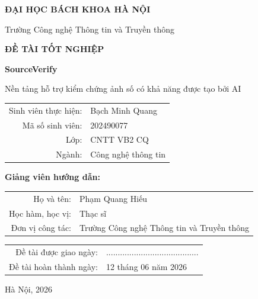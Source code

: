 \begin{titlepage}
\centering
{\Large\bfseries ĐẠI HỌC BÁCH KHOA HÀ NỘI\par}
\vspace{0.35cm}
{\large Trường Công nghệ Thông tin và Truyền thông\par}
\vspace{1.8cm}
{\Large\bfseries ĐỀ TÀI TỐT NGHIỆP\par}
\vspace{0.8cm}
{\Huge\bfseries SourceVerify\par}
\vspace{0.35cm}
{\Large Nền tảng hỗ trợ kiểm chứng ảnh số có khả năng được tạo bởi AI\par}
\vspace{1.6cm}
\begin{tabular}{rl}
Sinh viên thực hiện: & Bạch Minh Quang \\
Mã số sinh viên: & 202490077 \\
Lớp: & CNTT VB2 CQ \\
Ngành: & Công nghệ thông tin \\
\end{tabular}
\vspace{1.5cm}
\textbf{Giảng viên hướng dẫn:}
\vspace{0.5cm}
\begin{tabular}{rl}
Họ và tên: & Phạm Quang Hiếu \\
Học hàm, học vị: & Thạc sĩ \\
Đơn vị công tác: & Trường Công nghệ Thông tin và Truyền thông \\
\end{tabular}
\vspace{1.5cm}
\begin{tabular}{rl}
Đề tài được giao ngày: & ........................................ \\
Đề tài hoàn thành ngày: & 12 tháng 06 năm 2026 \\
\end{tabular}
\vfill
{\large Hà Nội, 2026\par}
\end{titlepage}
